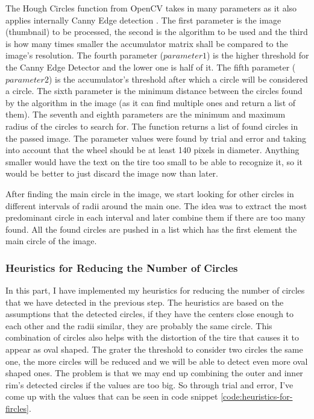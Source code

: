 The Hough Circles function from OpenCV takes in many parameters as it also applies internally Canny Edge detection \cite{site:Canny_edge_detection}. The first parameter is the image (thumbnail) to be processed, the second is the algorithm to be used and the third is how many times smaller the accumulator matrix shall be compared to the image's resolution. The fourth parameter ($parameter1$) is the higher threshold for the Canny Edge Detector and the lower one is half of it. The fifth parameter ($parameter2$) is the accumulator's threshold after which a circle will be considered a circle. The sixth parameter is the minimum distance between the circles found by the algorithm in the image (as it can find multiple ones and return a list of them). The seventh and eighth parameters are the minimum and maximum radius of the circles to search for. The function returns a list of found circles in the passed image. The parameter values were found by trial and error and taking into account that the wheel should be at least 140 pixels in diameter. Anything smaller would have the text on the tire too small to be able to recognize it, so it would be better to just discard the image now than later.

After finding the main circle in the image, we start looking for other circles in different intervals of radii around the main one. The idea was to extract the most predominant circle in each interval and later combine them if there are too many found. All the found circles are pushed in a list which has the first element the main circle of the image.

\subsubsection{Heuristics for Reducing the Number of Circles}

In this part, I have implemented my heuristics for reducing the number of circles that we have detected in the previous step. The heuristics are based on the assumptions that the detected circles, if they have the centers close enough to each other and the radii similar, they are probably the same circle. This combination of circles also helps with the distortion of the tire that causes it to appear as oval shaped. The grater the threshold to consider two circles the same one, the more circles will be reduced and we will be able to detect even more oval shaped ones. The problem is that we may end up combining the outer and inner rim's detected circles if the values are too big. So through trial and error, I've come up with the values that can be seen in code snippet \ref{code:heuristics-for-fircles}.

